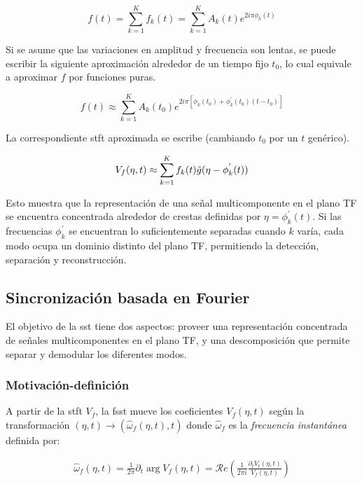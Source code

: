 \begin{equation}
  f(t) = \sum_{k=1}^K f_k(t) = \sum_{k=1}^K A_k(t) e^{2i\pi\phi_k(t)}
\end{equation}

\indent Si se asume que las variaciones en amplitud y frecuencia son lentas, se puede escribir la siguiente
aproximación alrededor de un tiempo fijo $t_0$, lo cual equivale a aproximar $f$ por funciones puras.

\begin{equation}
  f(t) \approx \sum_{k=1}^K A_k(t_0) e^{2i\pi[\phi_k(t_0)+\phi_k^{'}(t_0)(t-t_0)]}
\end{equation}

\indent La correspondiente \acrshort{stft} aproximada se escribe (cambiando $t_0$ por un $t$ genérico).

\begin{equation}
  V_f(\eta,t) \approx \sum_{k=1}^K f_k(t) \Tilde{g}(\eta-\phi_k^{'}(t))
\end{equation}

\indent Esto muestra que la representación de una señal multicomponente en el plano TF se encuentra concentrada
alrededor de crestas definidas por $\eta=\phi_k^{'}(t)$. Si las frecuencias $\phi_k^{'}$ se encuentran lo
suficientemente separadas cuando $k$ varía, cada modo ocupa un dominio distinto del plano TF, permitiendo la
detección, separación y reconstrucción.

\subsection*{Sincronización basada en Fourier}

\indent El objetivo de la \acrshort{sst} tiene dos aspectos: proveer una representación concentrada de señales
multicomponentes en el plano TF, y una descomposición que permite separar y demodular los diferentes modos.

\subsubsection*{Motivación-definición}

\indent A partir de la \acrshort{stft} $V_f$, la \acrshort{fsst} mueve los coeficientes $V_f(\eta,t)$ según la
transformación $(\eta,t) \rightarrow (\hat{\omega}_f(\eta,t),t)$ donde $\hat{\omega}_f$ es la \textit{frecuencia
instantánea} definida por:

\begin{align}
  \hat{\omega}_f(\eta,t) = \frac{1}{2\pi} \partial_t \arg V_f(\eta,t) = \mathcal{R}e\left(\frac{1}{2\pi
  i}\frac{\partial_t V_t(\eta,t)}{V_f(\eta,t)}\right)
\end{align}


